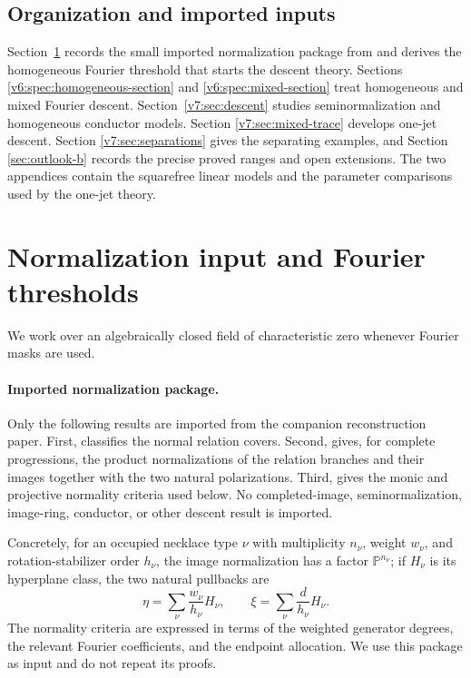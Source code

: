 \documentclass[10pt,fleqn]{article}
\numberwithin{equation}{section}
\newcommand{\PP}{\mathbb P}
\begin{document}
\subsection{Organization and imported inputs}

Section~\ref{sec:normalization-input} records the small imported
normalization package from \cite{LiProfileGeometry} and derives the
homogeneous Fourier threshold that starts the descent theory.  Sections
\ref{v6:spec:homogeneous-section} and \ref{v6:spec:mixed-section} treat
homogeneous and mixed Fourier descent.  Section~\ref{v7:sec:descent}
studies seminormalization and homogeneous conductor models.  Section
\ref{v7:sec:mixed-trace} develops one-jet descent.  Section
\ref{v7:sec:separations} gives the separating examples, and Section
\ref{sec:outlook-b} records the precise proved ranges and open extensions.
The two appendices contain the squarefree linear models and the parameter
comparisons used by the one-jet theory.
\section{Normalization input and Fourier thresholds}\label{sec:normalization-input}
We work over an algebraically closed field of characteristic zero whenever
Fourier masks are used.

\paragraph{Imported normalization package.}
Only the following results are imported from the companion reconstruction
paper.  First, \cite[Proposition~5.1]{LiProfileGeometry} classifies the normal
relation covers.  Second, \cite[Theorem~5.4]{LiProfileGeometry} gives, for
complete progressions, the product normalizations of the relation branches
and their images together with the two natural polarizations.  Third,
\cite[Theorems~6.1--6.2]{LiProfileGeometry} gives the monic and projective
normality criteria used below.  No completed-image, seminormalization,
image-ring, conductor, or other descent result is imported.

Concretely, for an occupied necklace type \(\nu\) with multiplicity
\(n_\nu\), weight \(w_\nu\), and rotation-stabilizer order \(h_\nu\), the
image normalization has a factor \(\PP^{n_\nu}\); if \(H_\nu\) is its
hyperplane class, the two natural pullbacks are
\[
 \eta=\sum_\nu \frac{w_\nu}{h_\nu}H_\nu,
 \qquad
 \xi=\sum_\nu \frac{d}{h_\nu}H_\nu.
\]
The normality criteria are expressed in terms of the weighted generator
degrees, the relevant Fourier coefficients, and the endpoint allocation.
We use this package as input and do not repeat its proofs.
\end{document}
